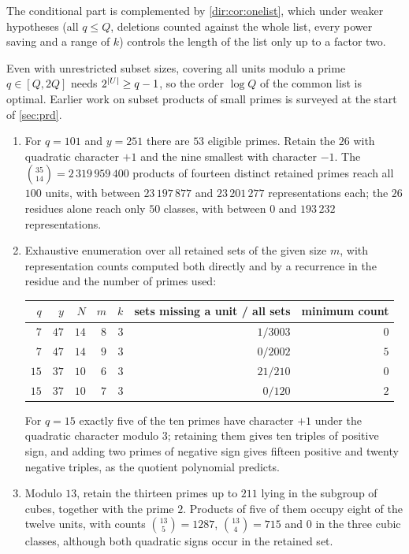The conditional part is complemented by \cref{dir:cor:onelist}, which under weaker
hypotheses (all $q\le Q$, deletions counted against the whole list, every power saving and a
range of $k$) controls the length of the list only up to a factor two.

Even with unrestricted subset sizes, covering all units modulo a prime $q\in[Q,2Q]$ needs
$2^{\lvert U\rvert}\ge q-1$, so the order $\log Q$ of the common list is optimal. Earlier work on subset
products of small primes is surveyed at the start of \cref{sec:prd}.

\begin{example}\label{dir:ex:products}
\begin{enumerate}[label=\textup{(\arabic*)}]
\item For $q=101$ and $y=251$ there are $53$ eligible primes. Retain the $26$ with quadratic
character $+1$ and the nine smallest with character $-1$. The $\binom{35}{14}=2\,319\,959\,400$
products of fourteen distinct retained primes reach all $100$ units, with between
$23\,197\,877$ and $23\,201\,277$ representations each; the $26$ residues alone reach only $50$
classes, with between $0$ and $193\,232$ representations.
\item Exhaustive enumeration over all retained sets of the given size $m$, with representation
counts computed both directly and by a recurrence in the residue and the number of primes
used:
\begin{center}\small
\begin{tabular}{rrrrrrr}
\toprule
$q$&$y$&$N$&$m$&$k$&sets missing a unit / all sets&minimum count\\
\midrule
$7$&$47$&$14$&$8$&$3$&$1/3003$&$0$\\
$7$&$47$&$14$&$9$&$3$&$0/2002$&$5$\\
$15$&$37$&$10$&$6$&$3$&$21/210$&$0$\\
$15$&$37$&$10$&$7$&$3$&$0/120$&$2$\\
\bottomrule
\end{tabular}
\end{center}
For $q=15$ exactly five of the ten primes have character $+1$ under the quadratic character
modulo $3$; retaining them gives ten triples of positive sign, and adding two primes of negative
sign gives fifteen positive and twenty negative triples, as the quotient polynomial predicts.
\item Modulo $13$, retain the thirteen primes up to $211$ lying in the subgroup of cubes,
together with the prime $2$. Products of five of them occupy eight of the twelve units, with
counts $\binom{13}5=1287$, $\binom{13}4=715$ and $0$ in the three cubic classes, although both
quadratic signs occur in the retained set.
\end{enumerate}
\end{example}




